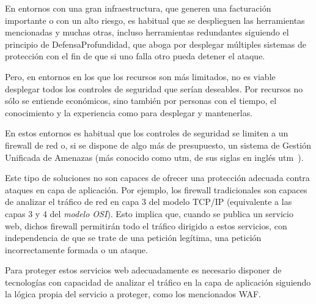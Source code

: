 \par En entornos con una gran infraestructura, que generen una facturación importante o con un alto riesgo, es habitual que se desplieguen las herramientas
mencionadas y muchas otras, incluso herramientas redundantes siguiendo el principio de \gls{DefensaProfundidad}, que aboga por desplegar múltiples sistemas
de protección con el fin de que si uno falla otro pueda detener el ataque.
\par Pero, en entornos en los que los recursos son más limitados, no es viable desplegar todos los controles de seguridad que serían deseables. Por recursos no
sólo se entiende económicos, sino también por personas con el tiempo, el conocimiento y la experiencia como para desplegar y mantenerlas.
\par En estos entornos es habitual que los controles de seguridad se limiten a un firewall de red o, si se dispone de algo más de presupuesto, un sistema de
Gestión Unificada de Amenazas (más conocido como \acrshort{utm}, de sus siglas en inglés \acrlong{utm}~\cite{wiki:utm}).
\par Este tipo de soluciones no son capaces de ofrecer una protección adecuada contra ataques en capa de aplicación. Por ejemplo, los firewall tradicionales son
capaces de analizar el tráfico de red en capa 3 del modelo TCP/IP\cite{wiki:tcpip} (equivalente a las capas 3 y 4 del {\em modelo OSI\cite{osi}}). Esto implica que, cuando se
publica un servicio web, dichos firewall permitirán todo el tráfico dirigido a estos servicios, con independencia de que se trate de una petición legítima, una
petición incorrectamente formada o un ataque.
\par Para proteger estos servicios web adecuadamente es necesario disponer de tecnologías con capacidad de analizar el tráfico en la capa de aplicación
siguiendo la lógica propia del servicio a proteger, como los mencionados WAF.

